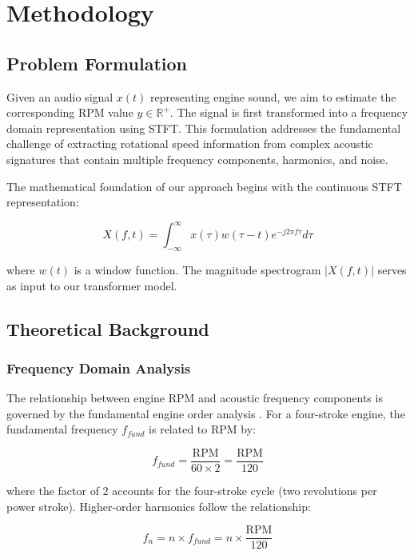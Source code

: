 \documentclass[journal,10pt]{IEEEtran}
\begin{document}
\section{Methodology}

\subsection{Problem Formulation}

Given an audio signal $x(t)$ representing engine sound, we aim to estimate the corresponding RPM value $y \in \mathbb{R}^+$. The signal is first transformed into a frequency domain representation using STFT. This formulation addresses the fundamental challenge of extracting rotational speed information from complex acoustic signatures that contain multiple frequency components, harmonics, and noise.

The mathematical foundation of our approach begins with the continuous STFT representation:

\begin{equation}
X(f, t) = \int_{-\infty}^{\infty} x(\tau) w(\tau - t) e^{-j2\pi f\tau} d\tau
\end{equation}

where $w(t)$ is a window function. The magnitude spectrogram $|X(f, t)|$ serves as input to our transformer model.

\subsection{Theoretical Background}

\subsubsection{Frequency Domain Analysis}

The relationship between engine RPM and acoustic frequency components is governed by the fundamental engine order analysis \cite{non2}. For a four-stroke engine, the fundamental frequency $f_{fund}$ is related to RPM by:

\begin{equation}
f_{fund} = \frac{\text{RPM}}{60 \times 2} = \frac{\text{RPM}}{120}
\end{equation}

where the factor of 2 accounts for the four-stroke cycle (two revolutions per power stroke). Higher-order harmonics follow the relationship:

\begin{equation}
f_n = n \times f_{fund} = n \times \frac{\text{RPM}}{120}
\end{equation}
\end{document}

